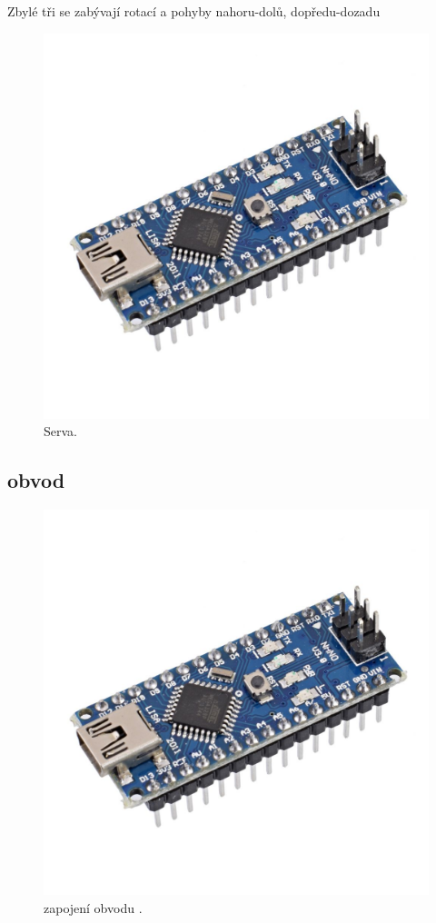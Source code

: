 \documentclass[12pt, a4paper,
twoside,        %
openright
]{report}
\begin{document}
{	Zbylé tři se zabývají rotací a pohyby nahoru-dolů, dopředu-dozadu

\begin{figure}[h]
	
	\centering
	\includegraphics[width=0.3\linewidth]{image/arduino.jpg} 
	
	\caption{Serva\cite{serva}.} %
	\label{fig:serva} %
\end{figure}

\newpage

\subsection{obvod}

\begin{figure}[h]
	
	\centering
	\includegraphics[width=0.9\linewidth]{image/arduino.jpg} 
	
	
	\caption{zapojení obvodu \cite{obvod}.} %
	\label{fig:obvod} %
\end{figure}

}
\end{document}
